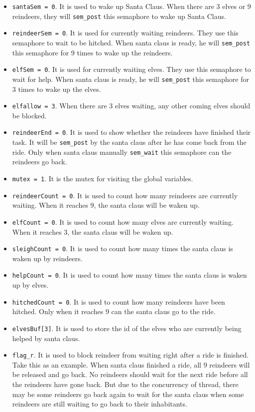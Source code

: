 \begin{itemize}
    \item \texttt{santaSem = 0}. It is used to wake up Santa Claus. When there are 3 elves or 9 reindeers, they will \texttt{sem\_post} this semaphore to wake up Santa Claus.
    \item \texttt{reindeerSem = 0}. It is used for currently waiting reindeers. They use this semaphore to wait to be hitched. When santa claus is ready, he will \texttt{sem\_post} this semaphore for 9 times to wake up the reindeers. 
    \item \texttt{elfSem = 0}. It is used for currently waiting elves. They use this semaphore to wait for help. When santa claus is ready, he will \texttt{sem\_post} this semaphore for 3 times to wake up the elves.
    \item \texttt{elfallow = 3}. When there are 3 elves waiting, any other coming elves should be blocked. 
    \item \texttt{reindeerEnd = 0}. It is used to show whether the reindeers have finished their task. It will be \texttt{sem\_post} by the santa claus after he has come back from the ride. Only when santa claus manually \texttt{sem\_wait} this semaphore can the reindeers go back.
    \item \texttt{mutex = 1}. It is the mutex for visiting the global variables.
    \item \texttt{reindeerCount = 0}. It is used to count how many reindeers are currently waiting. When it reaches 9, the santa claus will be waken up.
    \item \texttt{elfCount = 0}. It is used to count how many elves are currently waiting. When it reaches 3, the santa claus will be waken up.
    \item \texttt{sleighCount = 0}. It is used to count how many times the santa claus is waken up by reindeers.
    \item \texttt{helpCount = 0}. It is used to count how many times the santa claus is waken up by elves.
    \item \texttt{hitchedCount = 0}. It is used to count how many reindeers have been hitched. Only when it reaches 9 can the santa claus go to the ride.
    \item \texttt{elvesBuf[3]}. It is used to store the id of the elves who are currently being helped by santa claus.
    \item \texttt{flag\_r}. It is used to block reindeer from waiting right after a ride is finished. Take this as an example. When santa claus finished a ride, all 9 reindeers will be released and go back. No reindeers should wait for the next ride before all the reindeers have gone back. But due to the concurrency of thread, there may be some reindeers go back again to wait for the santa claus when some reindeers are still waiting to go back to their inhabitants. 

\end{itemize}
